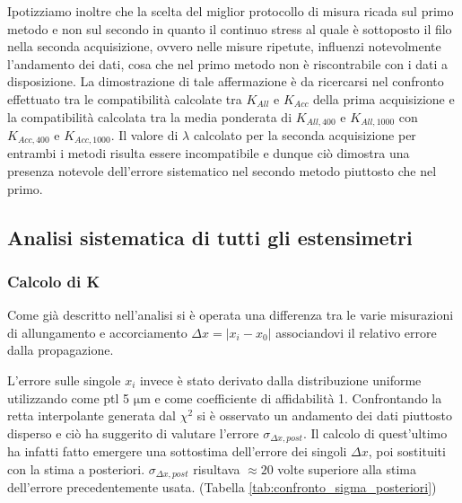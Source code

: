 \documentclass[a4paper,11pt,oneside]{article}
\begin{document}
Ipotizziamo inoltre che la scelta del miglior protocollo di misura ricada sul primo metodo e non sul secondo in quanto il continuo stress al quale è sottoposto il filo nella seconda acquisizione, ovvero nelle misure ripetute, influenzi notevolmente l'andamento dei dati, cosa che nel primo metodo non è riscontrabile con i dati a disposizione. La dimostrazione di tale affermazione è da ricercarsi nel confronto effettuato tra le compatibilità calcolate tra  $K_{All}$ e $K_{Acc}$ della prima acquisizione e la compatibilità calcolata tra la media ponderata di $K_{All, 400}$ e $K_{All, 1000}$ con $K_{Acc, 400}$ e $K_{Acc, 1000}$. Il valore di $\lambda$ calcolato per la seconda acquisizione per entrambi i metodi risulta essere incompatibile e dunque ciò dimostra una presenza notevole dell'errore sistematico nel secondo metodo piuttosto che nel primo.

\subsection{Analisi sistematica di tutti gli estensimetri}
\subsubsection*{Calcolo di K}
Come già descritto nell'analisi si è operata una differenza tra le varie misurazioni di allungamento e accorciamento $\Delta x= |x_i - x_0|$ associandovi il relativo errore dalla propagazione.

L'errore sulle singole $x_i$ invece è stato derivato dalla distribuzione uniforme utilizzando come ptl 5 $\si{\micro\meter}$ e come coefficiente di affidabilità 1. Confrontando la retta interpolante generata dal $\chi^2$ si è osservato un andamento dei dati piuttosto disperso e ciò ha suggerito di valutare l'errore $\sigma_{\Delta x, post}$. Il calcolo di quest'ultimo ha infatti fatto emergere una sottostima dell'errore dei singoli $\Delta x$, poi sostituiti con la stima a posteriori. $\sigma_{\Delta x, post}$ risultava $\approx 20$ volte superiore alla stima dell'errore precedentemente usata. (Tabella \ref{tab:confronto_sigma_posteriori})
\end{document}
